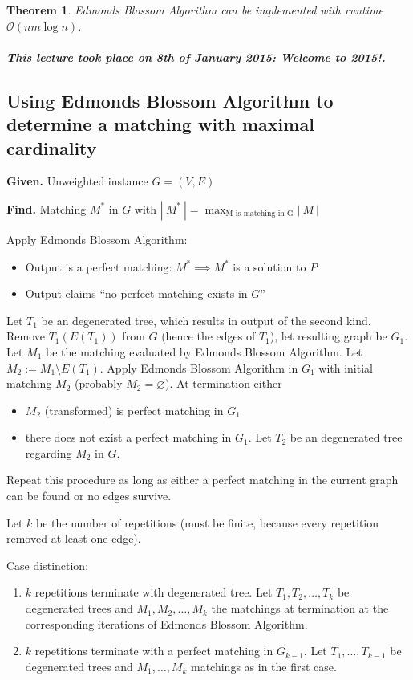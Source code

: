\documentclass{article}
\newtheorem{theorem}{Theorem}
\newcommand{\card}[1]{\left|\:\!#1\:\!\right|}
\newcommand{\given}[1]{\textbf{Given.} #1\par}
\newcommand{\find}[1]{\textbf{Find.} #1\par}
\newcommand{\dateref}[1]{\paragraph{\textit{This lecture took place on #1.}}}
\begin{document}
\begin{theorem}\label{satz-6.11}
  Edmonds Blossom Algorithm can be implemented with runtime $\mathcal{O}(nm\log{n})$.
\end{theorem}

\dateref{8th of January 2015: Welcome to 2015!}

\subsection{Using Edmonds Blossom Algorithm to determine a matching with maximal cardinality}

\given{Unweighted instance $G = (V, E)$}
\find{Matching $M^*$ in $G$ with $\card{M^*} = \max_{\text{M is matching in G}}{\card{M}}$}

Apply Edmonds Blossom Algorithm:
\begin{itemize}
  \item Output is a perfect matching: $M^* \implies M^*$ is a solution to $P$
  \item Output claims ``no perfect matching exists in $G$''
\end{itemize}

Let $T_1$ be an degenerated tree, which results in output of the second kind.
Remove $T_1(E(T_1))$ from $G$ (hence the edges of $T_1$), let resulting graph be $G_1$.
Let $M_1$ be the matching evaluated by Edmonds Blossom Algorithm.
Let $M_2 := M_1 \setminus E(T_1)$.
Apply Edmonds Blossom Algorithm in $G_1$ with initial matching $M_2$ (probably $M_2 = \diameter$).
At termination either
\begin{itemize}
  \item $M_2$ (transformed) is perfect matching in $G_1$
  \item there does not exist a perfect matching in $G_1$.
    Let $T_2$ be an degenerated tree regarding $M_2$ in $G$.
\end{itemize}

Repeat this procedure as long as either a perfect matching in the current graph can be found or no edges survive.

Let $k$ be the number of repetitions (must be finite, because every repetition removed at least one edge).

Case distinction:
\begin{enumerate}
  \item $k$ repetitions terminate with degenerated tree.
    Let $T_1, T_2, \ldots, T_k$ be degenerated trees and $M_1, M_2, \ldots, M_k$ the matchings at termination at the corresponding iterations of Edmonds Blossom Algorithm.
  \item $k$ repetitions terminate with a perfect matching in $G_{k-1}$.
    Let $T_1, \ldots, T_{k-1}$ be degenerated trees and $M_1, \ldots, M_k$ matchings as in the first case.
\end{enumerate}
\end{document}

